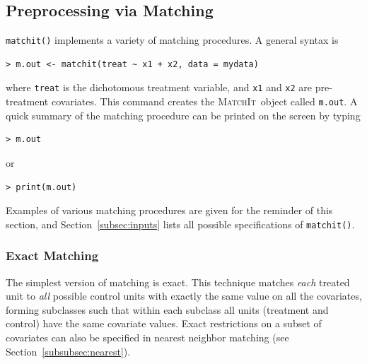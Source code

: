 \documentclass[oneside,letterpaper,titlepage]{article}
\newcommand{\MatchIt}{\textsc{MatchIt}}
\begin{document}

\subsection{Preprocessing via Matching}
\label{subsec:matching}

\texttt{matchit()} implements a variety of matching procedures.  A
general syntax is
\begin{verbatim}
> m.out <- matchit(treat ~ x1 + x2, data = mydata)
\end{verbatim}
where {\tt treat} is the dichotomous treatment variable, and {\tt x1}
and {\tt x2} are pre-treatment covariates.  This command creates the
\MatchIt\ object called \texttt{m.out}.  A quick summary of the
matching procedure can be printed on the screen by typing
\begin{verbatim}
> m.out
\end{verbatim}
or
\begin{verbatim}
> print(m.out)
\end{verbatim}
Examples of various matching procedures are given for the reminder of
this section, and Section~\ref{subsec:inputs} lists all possible
specifications of {\tt matchit()}.

\subsubsection{Exact Matching}
\label{subsubsec:exact}

The simplest version of matching is exact.  This technique matches
\emph{each} treated unit to \emph{all} possible control units with
exactly the same value on all the covariates, forming subclasses such
that within each subclass all units (treatment and control) have the
same covariate values.  Exact restrictions on a subset of covariates
can also be specified in nearest neighbor matching (see
Section~\ref{subsubsec:nearest}).
\end{document}
